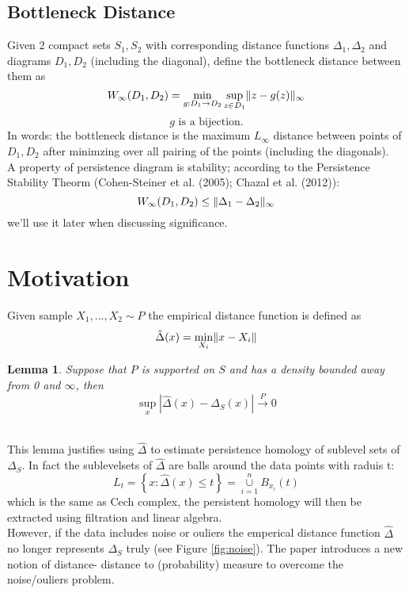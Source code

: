\documentclass[11pt]{article}
\newtheorem{lemma}[theorem]{Lemma}
\theoremstyle{definition}
\theoremstyle{definition}
\begin{document}

\subsection{Bottleneck Distance}
Given 2 compact sets $S_1,S_2$ with corresponding distance functions $\Delta_1, \Delta_2$ and diagrams $D_1,D_2$ (including the diagonal), define the bottleneck distance between them as
$$W_\infty (D_1,D_2) = \min_{g: D_1 \rightarrow D_2} \sup_{z \in D_1} \mathopen\| z - g(z) \mathclose\|_\infty$$
$$g \text{ is a bijection.}$$
In words: the bottleneck distance is the maximum $L_\infty$ distance between points of $D_1,D_2$ after minimzing over all pairing of the points (including the diagonals).\\
A property of persistence diagram is stability; according to the Persistence Stability Theorm (Cohen-Steiner et al. (2005); Chazal et al. (2012)):
$$W_\infty (D_1,D_2) \leq \mathopen\| \Delta_1 - \Delta_2 \mathclose\|_\infty$$
we'll use it later when discussing significance.




\section{Motivation}

Given sample $X_1,...,X_2 \sim P$ the empirical distance function is defined as
$$\hat{\Delta}(x) = \min_{X_i} \mathopen\| x-X_i \mathclose\|$$

\begin{lemma}
	Suppose that $P$ is supported on $S$ and has a density bounded away from 0 and $\infty$, then
	$$\sup_{x} |\hat{\Delta}(x) - \Delta_S(x)| \overset{P}{\rightarrow} 0$$
\end{lemma}
\text{ }\\
This lemma justifies using $\hat{\Delta}$ to estimate persistence homology of sublevel sets of $\Delta_S$. In fact the sublevelsets of $\hat{\Delta}$ are balls around the data points with raduis t:
$$L_t = \left\{ x: \hat{\Delta} (x) \leq t \right\} = \overset{n}{\underset{i=1}{\cup}} B_{x_i}(t)$$
which is the same as Cech complex, the persistent homology will then be extracted using filtration and linear algebra.\\
However, if the data includes noise or ouliers the emperical distance function $\hat\Delta$ no longer represents $\Delta_S$ truly (see Figure \ref{fig:noise}). The paper introduces a new notion of distance- distance to (probability) measure to overcome the noise/ouliers problem.
\end{document}
